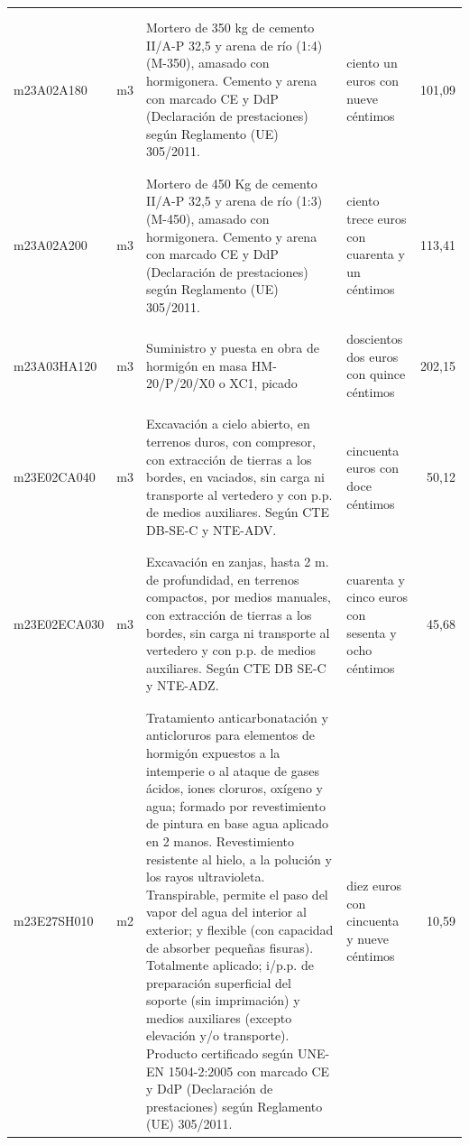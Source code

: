 \documentclass{book}%
\begin{document}
\begin{longtable}{|l|l|p{5cm}|p{3cm}|r|}
&&&&\\%
&&&&\\%
m23A02A180&m3&Mortero de 350 kg de cemento II/A{-}P 32,5 y arena de río (1:4) (M{-}350), amasado con hormigonera. Cemento y arena con marcado CE y DdP (Declaración de prestaciones) según Reglamento (UE) 305/2011.&ciento un euros con nueve céntimos&101,09\\%
&&&&\\%
&&&&\\%
m23A02A200&m3&Mortero de 450 Kg de cemento II/A{-}P 32,5 y arena de río (1:3) (M{-}450), amasado con hormigonera. Cemento y arena con marcado CE y DdP (Declaración de prestaciones) según Reglamento (UE) 305/2011.&ciento trece euros con cuarenta y un céntimos&113,41\\%
&&&&\\%
&&&&\\%
m23A03HA120&m3&Suministro y puesta en obra de hormigón en masa HM{-}20/P/20/X0 o XC1, picado&doscientos dos euros con quince céntimos&202,15\\%
&&&&\\%
&&&&\\%
m23E02CA040&m3&Excavación a cielo abierto, en terrenos duros, con compresor, con extracción de tierras a los bordes, en vaciados, sin carga ni transporte al vertedero y con p.p. de medios auxiliares. Según CTE DB{-}SE{-}C y NTE{-}ADV.&cincuenta euros con doce céntimos&50,12\\%
&&&&\\%
&&&&\\%
m23E02ECA030&m3&Excavación en zanjas, hasta 2 m. de profundidad, en terrenos compactos, por medios manuales, con extracción de tierras a los bordes, sin carga ni transporte al vertedero y con p.p. de medios auxiliares. Según CTE DB SE{-}C y NTE{-}ADZ.&cuarenta y cinco euros con sesenta y ocho céntimos&45,68\\%
&&&&\\%
&&&&\\%
m23E27SH010&m2&Tratamiento anticarbonatación y anticloruros para elementos de hormigón expuestos a la intemperie o al ataque de gases ácidos, iones cloruros, oxígeno y agua; formado por revestimiento de pintura en base agua aplicado en 2 manos. Revestimiento resistente al hielo, a la polución y los rayos ultravioleta. Transpirable, permite el paso del vapor del agua del interior al exterior; y flexible (con capacidad de absorber pequeñas fisuras). Totalmente aplicado; i/p.p. de preparación superficial del soporte (sin imprimación) y medios auxiliares (excepto elevación y/o transporte). Producto certificado según UNE{-}EN 1504{-}2:2005 con marcado CE y DdP (Declaración de prestaciones) según Reglamento (UE) 305/2011.&diez euros con cincuenta y nueve céntimos&10,59\\%

\end{longtable}
\end{document}
